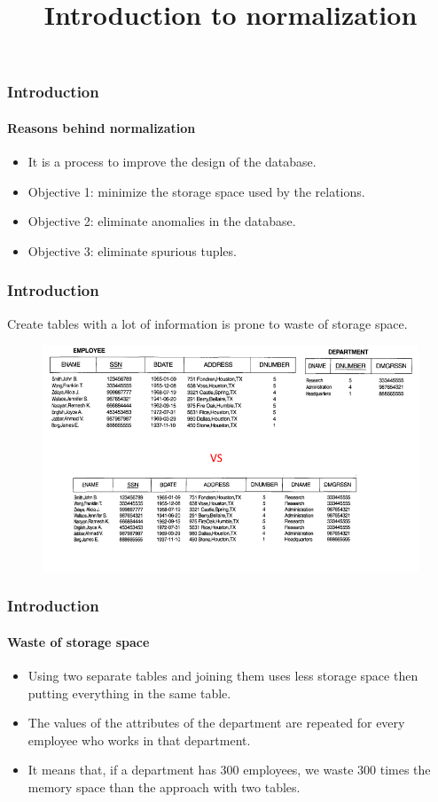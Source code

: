 \documentclass{beamer}
\title{Introduction to normalization}
\author{ }
\institute{DEV03-5 \\ The DEV team}
\date{}
\begin{document}
\maketitle


\begin{frame}
	\frametitle{Introduction}
	\framesubtitle{Reasons behind normalization}
	\begin{itemize}
		\item It is a process to improve the design of the database.
		\item Objective 1: minimize the storage space used by the relations.
		\item Objective 2: eliminate anomalies in the database.
		\item Objective 3: eliminate spurious tuples.
	\end{itemize}
\end{frame}

\begin{frame}
	\frametitle{Introduction}
	Create tables with a lot of information is prone to waste of storage space.

	\begin{figure}
		\includegraphics[scale=0.4]{img/normalization/norm1}
	\end{figure}
\end{frame}

\begin{frame}
	\frametitle{Introduction}
	\framesubtitle{Waste of storage space}
	\begin{itemize}
		\item Using two separate tables and joining them uses less storage space then putting everything in the same table.
		\item The values of the attributes of the department are repeated for every employee who works in that department.
		\item It means that, if a department has 300 employees, we waste 300 times the memory space than the approach with two tables.
	\end{itemize}
\end{frame}
\end{document}
